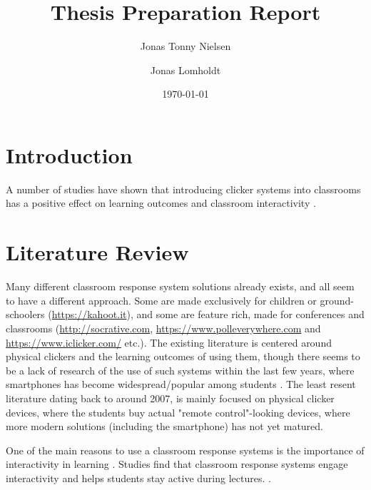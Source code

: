 \documentclass{article}
\title{Thesis Preparation Report}
\author{Jonas Tonny Nielsen \and Jonas Lomholdt}
\date{\today}
\begin{document}
\maketitle

\listoftodos

\tableofcontents


\section{Introduction} %
A number of studies have shown that introducing clicker systems into classrooms has a positive effect on learning outcomes and classroom interactivity \cite{yourstone2008classroom, siau2006use, lantz2014effectiveness}. 




\section{Literature Review} %
Many different classroom response system solutions already exists, and all seem to have a different approach. Some are made exclusively for children or ground-schoolers (\url{https://kahoot.it}), and some are feature rich, made for conferences and classrooms (\url{http://socrative.com},  \url{https://www.polleverywhere.com} and \url{https://www.iclicker.com/} etc.). The existing literature is centered around physical clickers and the learning outcomes of using them, though there seems to be a lack of research of the use of such systems within the last few years, where smartphones has become widespread/popular among students \cite[p.~1]{stowell2015use}. The least resent literature dating back to around 2007, is mainly focused on physical clicker devices, where the students buy actual "remote control"-looking devices, where more modern solutions (including the smartphone) has not yet matured.





One of the main reasons to use a classroom response systems is the importance of interactivity in learning \cite{draper2004increasing}.  Studies find that classroom response systems engage interactivity  and helps students stay active during lectures. \cite[p.~116]{moredich2007engaging}.
\end{document}
